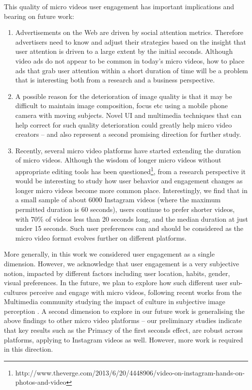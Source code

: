This quality of micro videos user engagement has important implications and bearing on future work: 
\begin{enumerate}
	\item Advertisements on the Web are driven by social attention metrics. Therefore advertisers need to know and adjust their strategies based on the insight that user attention is driven to a large extent by the initial seconds. Although  video ads do not appear to be common in today's micro videos, how to place ads that grab user attention within a short duration of time will be a problem that is interesting both from a research and a business perspective. 
	\item A possible reason for the deterioration of image quality is that it may be difficult to maintain image composition, focus etc using a mobile phone camera with moving subjects. Novel UI and multimedia techniques that can help correct for such quality deterioration could greatly help micro video creators -- and also represent a second promising direction for further study. 
	\item Recently, several micro video platforms have started extending the duration of micro videos. Although the wisdom of longer micro videos without appropriate editing tools has been questioned\footnote{\scriptsize http://www.theverge.com/2013/6/20/4448906/video-on-instagram-hands-on-photos-and-video}, from a research perspective it would be interesting to study how user behavior and engagement changes as longer micro videos become more common place. Interestingly, we find that in a small sample of about 6000 Instagram videos (where the maximum permitted duration is 60 seconds), users continue to prefer shorter videos, with 70\% of videos less than 20 seconds long, and the median duration at just under 15 seconds. Such user preferences can and should be considered as the micro video format evolves further on different platforms.
	\end{enumerate}

More generally, in this work we considered user engagement as a single dimension. However, we acknowledge that user engagement is a very subjective notion, impacted by different factors including user location, habits, gender, visual preferences. In the future, we plan to explore how such different user sub-cultures perceive and engage with micro videos, following recent works from the Multimedia community studying the impact of culture in subjective image perception \cite{jou2015visual}. A second dimension to explore in our future work is generalising the above findings to other micro video platforms -- our preliminary studies indicate that key results such as the Primacy of the first seconds effect, are robust across platforms, applying to Instagram videos as well. However, more work is required in this direction.


